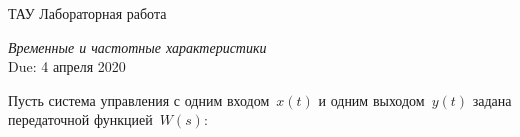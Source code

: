 \documentclass[a4paper,oneside,10pt]{book}
\theoremstyle{definition}
\begin{document}
\begin{center}
	{\large  ТАУ \hspace{0.1cm} Лабораторная работа }

	\vspace{5pt}
	\textit{\large Временные и частотные характеристики}\\ %
	\vspace{10pt}
	Due: 4 апреля 2020 %
\end{center}

\vspace{0.2 cm}



Пусть система управления с одним входом~$ x(t) $ и одним выходом~$ y(t) $ задана  передаточной функцией~$ W(s) $:
\end{document}
